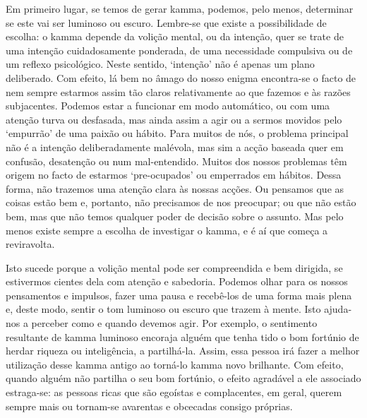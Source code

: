 Em primeiro lugar, se temos de gerar kamma, podemos, pelo menos, determinar se
este vai ser luminoso ou escuro. Lembre-se que existe a possibilidade de
escolha: o kamma depende da volição mental, ou da intenção, quer se trate de uma
intenção cuidadosamente ponderada, de uma necessidade compulsiva ou de um
reflexo psicológico. Neste sentido, `intenção' não é apenas um plano deliberado.
Com efeito, lá bem no âmago do nosso enigma encontra-se o facto de nem sempre
estarmos assim tão claros relativamente ao que fazemos e às razões subjacentes.
Podemos estar a funcionar em modo automático, ou com uma atenção turva ou
desfasada, mas ainda assim a agir ou a sermos movidos pelo `empurrão' de uma
paixão ou hábito. Para muitos de nós, o problema principal não é a intenção
deliberadamente malévola, mas sim a acção baseada quer em confusão, desatenção
ou num mal-entendido. Muitos dos nossos problemas têm origem no facto de
estarmos `pre-ocupados' ou emperrados em hábitos. Dessa forma, não trazemos uma
atenção clara às nossas acções. Ou pensamos que as coisas estão bem e, portanto,
não precisamos de nos preocupar; ou que não estão bem, mas que não temos
qualquer poder de decisão sobre o assunto. Mas pelo menos existe sempre a
escolha de investigar o kamma, e é aí que começa a reviravolta.

Isto sucede porque a volição mental pode ser compreendida e bem dirigida, se
estivermos cientes dela com atenção e sabedoria. Podemos olhar para os nossos
pensamentos e impulsos, fazer uma pausa e recebê-los de uma forma mais plena e,
deste modo, sentir o tom luminoso ou escuro que trazem à mente. Isto ajuda-nos a
perceber como e quando devemos agir. Por exemplo, o sentimento resultante de
kamma luminoso encoraja alguém que tenha tido o bom fortúnio de herdar riqueza
ou inteligência, a partilhá-la. Assim, essa pessoa irá fazer a melhor utilização
desse kamma antigo ao torná-lo kamma novo brilhante. Com efeito, quando alguém
não partilha o seu bom fortúnio, o efeito agradável a ele associado estraga-se:
as pessoas ricas que são egoístas e complacentes, em geral, querem sempre mais
ou tornam-se avarentas e obcecadas consigo próprias.

